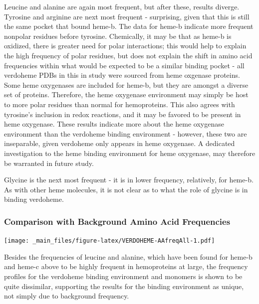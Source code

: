 \documentclass[a4paper, nobind]{templates/ociamthesis}
\let\origfigure\figure
\let\endorigfigure\endfigure
\renewenvironment{figure}[1][2] {
    \expandafter\origfigure\expandafter[H]
} {
    \endorigfigure
}
\begin{document}
Leucine and alanine are again most frequent, but after these, results diverge. Tyrosine and arginine are next most frequent - surprising, given that this is still the same pocket that bound heme-b. The data for heme-b indicate more frequent nonpolar residues before tyrosine. Chemically, it may be that as heme-b is oxidized, there is greater need for polar interactions; this would help to explain the high frequency of polar residues, but does not explain the shift in amino acid frequencies within what would be expected to be a similar binding pocket - all verdoheme PDBs in this in study were sourced from heme oxgenase proteins. Some heme oxygenases are included for heme-b, but they are amongst a diverse set of proteins. Therefore, the heme oxygenase environment may simply be host to more polar residues than normal for hemoproteins. This also agrees with tyrosine's inclusion in redox reactions, and it may be favored to be present in heme oxygenase. These results indicate more about the heme oxygenase environment than the verdoheme binding environment - however, these two are inseparable, given verdoheme only appears in heme oxygenase. A dedicated investigation to the heme binding environment for heme oxygenase, may therefore be warranted in future study.

Glycine is the next most frequent - it is in lower frequency, relatively, for heme-b. As with other heme molecules, it is not clear as to what the role of glycine is in binding verdoheme.

\hypertarget{comparison-with-background-amino-acid-frequencies-2}{%
\subsubsection{Comparison with Background Amino Acid Frequencies}\label{comparison-with-background-amino-acid-frequencies-2}}

\begin{figure}
\centering
\texttt{[image: \_main\_files/figure-latex/VERDOHEME-AAfreqAll-1.pdf]}
\caption{\label{fig:VERDOHEME-AAfreqAll}VERDOHEME: AA Frequency of Monomer}
\end{figure}

Besides the frequencies of leucine and alanine, which have been found for heme-b and heme-c above to be highly frequent in hemoproteins at large, the frequency profiles for the verdoheme binding environment and monomers is shown to be quite dissimilar, supporting the results for the binding environment as unique, not simply due to background frequency.
\end{document}
